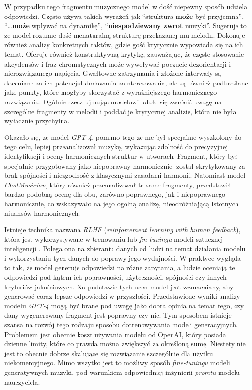 \documentclass[data-science]{agh-wi} %
\begin{document}
W przypadku tego fragmentu muzycznego model w dość niepewny sposób udziela odpowiedzi. Często używa takich wyrażeń jak ``struktura \textbf{może} być przyjemna'', ``\dots \textbf{może} wpływać na dynamikę'', ``\textbf{niespodziewany zwrot} muzyki''. Sugeruje to że model rozumie dość nienaturalną strukturę przekazanej mu melodii. Dokonuje również analizy konkretnych taktów, gdzie gość krytycznie wypowiada się na ich temat. Oferuje również konstruktywną krytykę, zauważając, że częste stosowanie akcydensów i fraz chromatycznych może wywoływać poczucie dezorientacji i nierozwiązanego napięcia. Gwałtowne zatrzymania i złożone interwały są doceniane za ich potencjał dodawania zainteresowania, ale są również podkreślane jako punkty, które mogłyby skorzystać z wyraźniejszego harmonicznego rozwiązania. Ogólnie rzecz ujmując modelowi udało się zwrócić uwagę na szczególne fragmenty w melodii i poddać je krytycznej analizie, która nie była wyłacznie przychylna.

Okazało się, że model \textit{GPT-4}, pomimo tego że nie był specjalnie wyszkolony do tego celu, lepiej przeanalizował muzykę, wykazując zdolność do precyzyjnej identyfikacji i oceny harmonicznych struktur w utworach. Fragment, który był specjalnie przygotowany jako niepoprawny harmonicznie, został skrytykowany za brak spójności i niezgodność z klasycznymi zasadami harmonii. Natomiast model \textit{ChatMusician}, który również przeanalizował te same fragmenty, przedstawił bardzo podobną ocenę dla obu, zarówno poprawnego, jak i niepoprawnego harmonicznie, co wskazywało na jego ogólną analizę, nieodróżniającą istotnych niuansów harmonicznych.

Istnieje technika nazwana \textit{RLHF} (\textit{reinforcement learning with human feedback}), która jest wykorzystywane w trenowaniu lub \textit{fin-tuningu} modeli sztucznej inteligencji \cite{rl_training}. Polega ona na zbieraniu danych od ludzi na temat działania modelu i wykorzystaniu tych danych do poprawy jego wydajności. W praktyce wygląda to tak, że model generuje odpowiedzi na różne zapytania, a ludzie oceniają te odpowiedzi pod kątem ich poprawności, użyteczności, spójności czy innych kryteriów jakościowych. Na podstawie tych ocen model jest wzmacniany, aby generować coraz lepsze odpowiedzi w przyszłości. Przedstawione wyniki analizy modelu \textit{GPT-4} mogą być brane pod uwagę jako dobra opinia na temat tego, czy dany wygenerowany fragment jest poprawny czy nie. Tym sposobem istnieje szansa na rozwój tego rodzaju sposobu dotrenowywania modeli generacyjnych. Problemem jest obecnie koszt używania modelu od OpenAI, który posiada dzienne limity, które co prawda można zwiększyć za określoną sumę. Niestety nie jest to obecnie dobrze skalujące się rozwiązanie szczególnie dla użytku niekomercyjnego. Mimo wszytko jest to możliwy sposób \textit{fine-tuningu} modeli generatywnych muzyki, pod warunkiem odpowiedniej inżynierii \textit{promtu} modelu nauczyciela.
\end{document}
